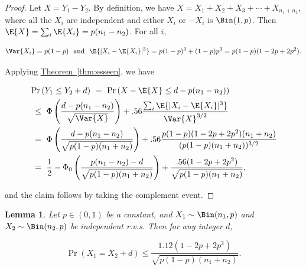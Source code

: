 \documentclass[11pt]{article}
\numberwithin{equation}{section}
\newtheorem{lemma}[theorem]{Lemma}
\theoremstyle{definition}
\theoremstyle{plain}
\newcommand{\expref}[2]{\hyperref[#2]{#1~\ref{#2}}}
\begin{document}
			\begin{proof}
				Let $X = Y_1 - Y_2$. By definition, we have
				$
				X = X_1 + X_2 + X_3 + \cdots + X_{n_1+n_2},
				$
				where all %
				the $X_i$   %
				are independent and either $X_i$ or $-X_i$ is $\Bin(1, p)$.
				Then $\E{X} = \sum_i\E{X_i} = p(n_1 - n_2)$.
				For all $i$,
				\begin{linenomath}\begin{equation*}
						\Var{X_i} = p(1 - p) \ \text{ and } \ \E{|X_i - \E{X_i}|^3} = p(1 - p)^3 + (1 - p)p^3 = p(1 - p)(1 - 2p + 2p^2).
				\end{equation*}\end{linenomath}
				Applying \expref{Theorem}{thm:esseen}, we have
				\begin{linenomath}\begin{equation*} \label{eq:temp68}
						\begin{aligned}
							& \Pr\left(Y_1 \le Y_2 + d\right) \ = \ \Pr\left(X - \E{X} \le d - p(n_1 - n_2)\right)
							\\
							& \ \le \ \Phi\left(\frac{d - p(n_1 - n_2)}{\sqrt{\Var{X}}} \right)
							+ .56 \frac{\sum_i \E{|X_i - \E{X_i}|^3} }{\Var{X}^{3/2}}
							\\
							& \ = \ \Phi\left(\frac{d - p(n_1 - n_2)}{\sqrt{p(1 - p)(n_1 + n_2)}} \right)
							+ .56 \frac{p(1 - p) (1 - 2p + 2p^2)(n_1 + n_2) }{(p(1 - p)(n_1 + n_2))^{3/2}}
							\\
							& \ = \ \frac{1}{2} - \Phi_0\left(\frac{p(n_1 - n_2) - d}{\sqrt{p(1 - p)(n_1 + n_2)}} \right)
							+ \frac{.56(1 - 2p + 2p^2) }{\sqrt{p(1 - p)(n_1 + n_2)}},
						\end{aligned}
				\end{equation*}\end{linenomath}
				and the claim follows by taking the complement event.
			\end{proof}
			
			\begin{lemma} \label{thm:1/sqrt{n}}
				Let $p \in (0, 1)$ be a constant, and $X_1 \sim \Bin(n_1, p)$ and $X_2 \sim \Bin(n_2, p)$ be independent r.v.s. Then for any integer $d$,
				\begin{linenomath}\begin{equation*}
						\Pr\left(X_1 = X_2 + d \right) \le \frac{1.12\left(1 - 2p + 2p^2\right)}{\sqrt{p(1 - p)(n_1 + n_2)}}.
				\end{equation*}\end{linenomath}
			\end{lemma}
			
\end{document}
